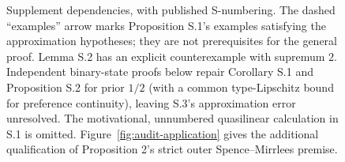 \documentclass[11pt]{article}
\theoremstyle{remark}\newtheorem{remark}[theorem]{Remark}
\begin{document}
\begin{figure}[p]
\caption{Supplement dependencies, with published S-numbering. The dashed
``examples'' arrow marks Proposition S.1's examples satisfying the
approximation hypotheses; they are not prerequisites for the general proof.
Lemma S.2 has an explicit counterexample with supremum \(2\).
Independent binary-state proofs below repair Corollary S.1 and
Proposition S.2 for prior $1/2$ (with a common type-Lipschitz bound for
preference continuity), leaving S.3's approximation error unresolved.
The motivational, unnumbered quasilinear calculation in S.1 is omitted.
Figure~\ref{fig:audit-application} gives the additional qualification of
Proposition 2's strict outer Spence--Mirrlees premise.}
\label{fig:audit-supplement}
\end{figure}
\FloatBarrier
\end{document}
